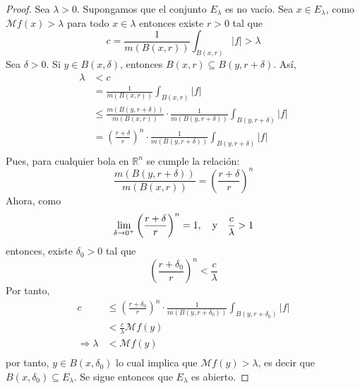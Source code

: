 \documentclass[12pt]{report}
\newcounter{it}
\theoremstyle{largebreak}
\renewcommand{\leq}{\ensuremath{\leqslant}}
\newcommand\abs[1]{\ensuremath{\left|#1\right|}}
\begin{document}
    \begin{proof}
        Sea $\lambda>0$. Supongamos que el conjunto $E_\lambda$ es no vacío. Sea $x\in E_\lambda$, como $\mathcal{M}f(x)>\lambda$ para todo $x\in\lambda$ entonces existe $r>0$ tal que
        \begin{equation*}
            c=\frac{1}{m(B(x,r))}\int_{ B(x,r)}\abs{f}>\lambda
        \end{equation*}
        Sea $\delta>0$. Si $y\in B(x,\delta)$, entonces $B(x,r)\subseteq B(y,r+\delta)$. Así,
        \begin{equation*}
            \begin{split}
                \lambda&<c\\
                &=\frac{1}{m(B(x,r))}\int_{ B(x,r)}\abs{f}\\
                &\leq\frac{m(B(y,r+\delta))}{m(B(x,r))}\cdot\frac{1}{m(B(y,r+\delta))}\int_{ B(y,r+\delta)}\abs{f}\\
                &=\left(\frac{r+\delta}{r} \right)^n\cdot\frac{1}{m(B(y,r+\delta))}\int_{ B(y,r+\delta)}\abs{f}\\
            \end{split}
        \end{equation*}
        Pues, para cualquier bola en $\mathbb{R}^n$ se cumple la relación:
        \begin{equation*}
            \frac{m(B(y,r+\delta))}{m(B(x,r))}=\left(\frac{r+\delta}{r} \right)^n
        \end{equation*}
        Ahora, como
        \begin{equation*}
            \lim_{\delta\rightarrow0^+}\left(\frac{r+\delta}{r}\right)^n=1,\quad\textup{y}\quad\frac{c}{\lambda}>1
        \end{equation*}
        entonces, existe $\delta_0>0$ tal que
        \begin{equation*}
            \left(\frac{r+\delta_0}{r}\right)^n<\frac{c}{\lambda}
        \end{equation*}
        Por tanto,
        \begin{equation*}
            \begin{split}
                c&\leq\left(\frac{r+\delta_0}{r} \right)^n\cdot\frac{1}{m(B(y,r+\delta_0))}\int_{ B(y,r+\delta_0)}\abs{f}\\
                &<\frac{c}{\lambda}\mathcal{M}f(y)\\
                \Rightarrow \lambda&<\mathcal{M}f(y)\\
            \end{split}
        \end{equation*}
        por tanto, $y\in B(x,\delta_0)$ lo cual implica que $\mathcal{M}f(y)>\lambda$, es decir que $B(x,\delta_0)\subseteq E_\lambda$. Se sigue entonces que $E_\lambda$ es abierto.
    \end{proof}
\end{document}
